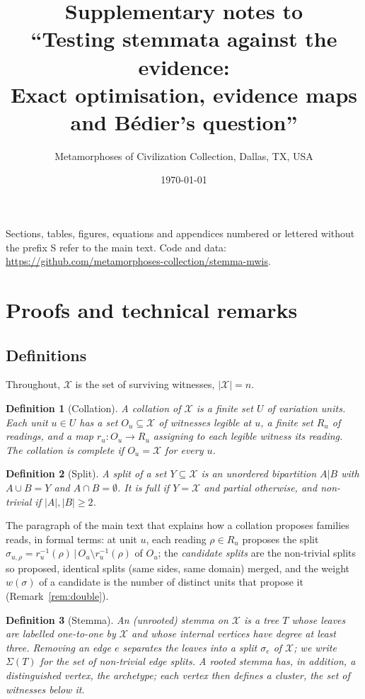 \documentclass[11pt,a4paper]{article}
\title{Supplementary notes to\\ ``Testing stemmata against the evidence:\\ Exact optimisation, evidence maps and Bédier's question''}
\author{Metamorphoses of Civilization Collection, Dallas, TX, USA}
\date{\today}
\newtheorem{definition}{Definition}
\theoremstyle{remark}
\newcommand{\X}{\mathcal{X}}
\begin{document}
\maketitle
\noindent Sections, tables, figures, equations and appendices numbered or lettered without the prefix S refer to the main text. Code and data: \url{https://github.com/metamorphoses-collection/stemma-mwis}.
\tableofcontents

\raggedbottom
\section{Proofs and technical remarks}
\label{app:proofs}
\subsection*{Definitions}
Throughout, $\X$ is the set of surviving witnesses, $|\X|=n$.

\begin{definition}[Collation]
A \emph{collation} of $\X$ is a finite set $U$ of \emph{variation units}. Each unit $u\in U$ has a set $O_u\subseteq\X$ of witnesses legible at $u$, a finite set $R_u$ of readings, and a map $r_u:O_u\to R_u$ assigning to each legible witness its reading. The collation is \emph{complete} if $O_u=\X$ for every $u$.
\end{definition}

\begin{definition}[Split]
A \emph{split} of a set $Y\subseteq\X$ is an unordered bipartition $A|B$ with $A\cup B=Y$ and $A\cap B=\emptyset$. It is \emph{full} if $Y=\X$ and \emph{partial} otherwise, and \emph{non-trivial} if $|A|,|B|\ge2$.
\end{definition}

The paragraph of the main text that explains how a collation proposes families reads, in formal terms: at unit $u$, each reading $\rho\in R_u$ proposes the split $\sigma_{u,\rho}=r_u^{-1}(\rho)\,|\,O_u\setminus r_u^{-1}(\rho)$ of $O_u$; the \emph{candidate splits} are the non-trivial splits so proposed, identical splits (same sides, same domain) merged, and the weight $w(\sigma)$ of a candidate is the number of distinct units that propose it (Remark~\ref{rem:double}).

\begin{definition}[Stemma]
An (unrooted) \emph{stemma} on $\X$ is a tree $T$ whose leaves are labelled one-to-one by $\X$ and whose internal vertices have degree at least three. Removing an edge $e$ separates the leaves into a split $\sigma_e$ of $\X$; we write $\Sigma(T)$ for the set of non-trivial edge splits. A \emph{rooted} stemma has, in addition, a distinguished vertex, the archetype; each vertex then defines a \emph{cluster}, the set of witnesses below it.
\end{definition}
\end{document}

